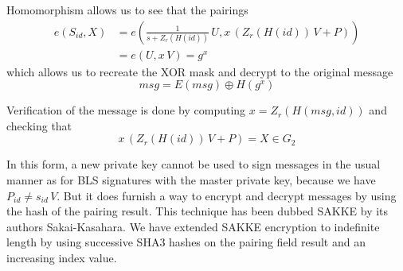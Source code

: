 \documentclass{yellowpaper}
\begin{document}
Homomorphism allows us to see that the pairings 
$$
\begin{align}
    e(S_{id}, X) &= e(\frac{1}{s + Z_r(H(id))}\, U, x\,(Z_r(H(id)) \, V + P)) \\
    &= e(U, x\, V) = g^x
\end{align}$$ 
which allows us to recreate the XOR mask and decrypt to the original message 
$$msg = E(msg) \oplus H(g^x)$$ 

Verification of the message is done by computing $x = Z_r(H(msg, id))$ and checking that 
$$x\, (Z_r(H(id))\, V + P) = X \in G_2$$

In this form, a new private key cannot be used to sign messages in the usual manner as for BLS signatures with the master private key, because we have $P_{id} \neq s_{id} \, V$. But it does furnish a way to encrypt and decrypt messages by using the hash of the pairing result. This technique has been dubbed SAKKE by its authors Sakai-Kasahara\cite{sakke}. We have extended SAKKE encryption to indefinite length by using successive SHA3 hashes on the pairing field result and an increasing index value.

\balance


%   
\end{document}
